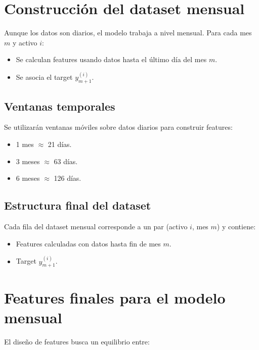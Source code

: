 \documentclass[12pt]{article}
\begin{document}
\section{Construcción del dataset mensual}

Aunque los datos son diarios, el modelo trabaja a nivel mensual. Para cada mes $m$ y activo $i$:

\begin{itemize}
    \item Se calculan features usando datos hasta el último día del mes $m$.
    \item Se asocia el target $y_{m+1}^{(i)}$.
\end{itemize}

\subsection{Ventanas temporales}

Se utilizarán ventanas móviles sobre datos diarios para construir features:

\begin{itemize}
    \item 1 mes $\approx$ 21 días.
    \item 3 meses $\approx$ 63 días.
    \item 6 meses $\approx$ 126 días.
\end{itemize}

\subsection{Estructura final del dataset}

Cada fila del dataset mensual corresponde a un par (activo $i$, mes $m$) y contiene:

\begin{itemize}
    \item Features calculadas con datos hasta fin de mes $m$.
    \item Target $y_{m+1}^{(i)}$.
\end{itemize}

\section{Features finales para el modelo mensual}

El diseño de features busca un equilibrio entre:
\end{document}
